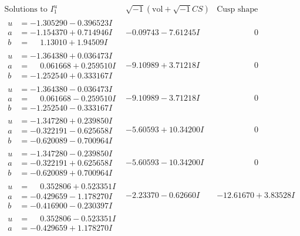 \documentclass[1p]{elsarticle_modified}
\theoremstyle{definition}
\newcommand{\I}{\sqrt{-1}}
\begin{document}
$$\begin{array}{c|c|c}
\text{Solutions to }I^u_{1}& \I (\text{vol} + \sqrt{-1}CS) & \text{Cusp shape}\\
 \hline 
\begin{aligned}
u &= -1.305290 - 0.396523 I \\
a &= -1.154370 + 0.714946 I \\
b &= \phantom{-}1.13010 + 1.94509 I\end{aligned}
 & -0.09743 - 7.61245 I & \phantom{-0.000000 } 0 \\ \hline\begin{aligned}
u &= -1.364380 + 0.036473 I \\
a &= \phantom{-}0.061668 + 0.259510 I \\
b &= -1.252540 + 0.333167 I\end{aligned}
 & -9.10989 + 3.71218 I & \phantom{-0.000000 } 0 \\ \hline\begin{aligned}
u &= -1.364380 - 0.036473 I \\
a &= \phantom{-}0.061668 - 0.259510 I \\
b &= -1.252540 - 0.333167 I\end{aligned}
 & -9.10989 - 3.71218 I & \phantom{-0.000000 } 0 \\ \hline\begin{aligned}
u &= -1.347280 + 0.239850 I \\
a &= -0.322191 - 0.625658 I \\
b &= -0.620089 - 0.700964 I\end{aligned}
 & -5.60593 + 10.34200 I & \phantom{-0.000000 } 0 \\ \hline\begin{aligned}
u &= -1.347280 - 0.239850 I \\
a &= -0.322191 + 0.625658 I \\
b &= -0.620089 + 0.700964 I\end{aligned}
 & -5.60593 - 10.34200 I & \phantom{-0.000000 } 0 \\ \hline\begin{aligned}
u &= \phantom{-}0.352806 + 0.523351 I \\
a &= -0.429659 - 1.178270 I \\
b &= -0.416900 - 0.230397 I\end{aligned}
 & -2.23370 - 0.62660 I & -12.61670 + 3.83528 I \\ \hline\begin{aligned}
u &= \phantom{-}0.352806 - 0.523351 I \\
a &= -0.429659 + 1.178270 I \\

\end{aligned}
\end{array}$$
\end{document}
